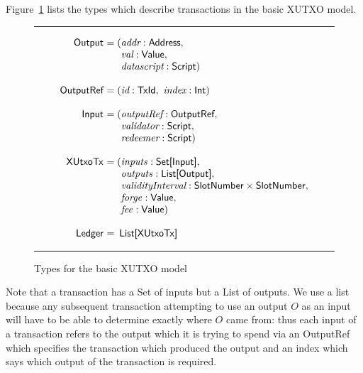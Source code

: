\documentclass[a4paper]{article}
\renewcommand{\i}{\textit}  %
\newcommand{\s}{\textsf}  %
\theoremstyle{definition}  %
\newenvironment{arraydefs}[1]{\setlength{\arraycolsep}{0pt}\begin{array}{#1}}{\end{array}}
\newenvironment{ruledfigure}[1]{\begin{figure}[#1]\hrule\vspace{10pt}}{\vspace{10pt}\hrule\end{figure}}
\begin{document}
\newcommand{\slotnum}{\ensuremath{\mathsf{SlotNumber}}}
\newcommand{\spent}{\ensuremath{\mathsf{spentOutputs}}}
\newcommand{\unspent}{\ensuremath{\mathsf{unspentOutputs}}}
\newcommand{\xutxotx}{\ensuremath{\mathsf{XUtxoTx}}}

\noindent Figure~\ref{fig:basic-xutxo-types} lists the types which
describe transactions in the basic XUTXO model.

\begin{ruledfigure}{H}
  \[
  \begin{arraydefs}{rll}
    
    \s{Output } &= (&\i{addr}: \s{Address},\\
    && \i{val}: \s{Value},\\
    &&  \i{datascript}: \s{Script})\\
    \\
    \s{OutputRef } &= (&\i{id}: \s{TxId},\ \i{index}: \s{Int})\\
    \\
    \s{Input } & = (&\i{outputRef}: \s{OutputRef},\\
                 && \i{validator}: \s{Script},\\
                 && \i{redeemer}: \s{Script})\\
     \\
     \xutxotx\s{ } &= (&\inputs: \s{Set[Input]},\\
     &&\outputs: \s{List[Output]},\\
     &&\i{validityInterval}: \slotnum \times \slotnum,\\
     &&\forge: \s{Value}, \\
     && \fee: \s{Value})\\
     \\
     \s{Ledger } &=&\!\s{List[}\xutxotx\s{]}\\
  \end{arraydefs}
  \]
  \caption{Types for the basic XUTXO model}
  \label{fig:basic-xutxo-types}
\end{ruledfigure}

\noindent Note that a transaction has a \textsf{Set} of inputs but a
\textsf{List} of outputs. We use a list because any subsequent
transaction attempting to use an output $O$ as an input will have to
be able to determine exactly where $O$ came from: thus each input of a
transaction refers to the output which it is trying to spend via an
\s{OutputRef} which specifies the transaction which produced the
output and an index which says which output of the transaction is required. 
\end{document}
